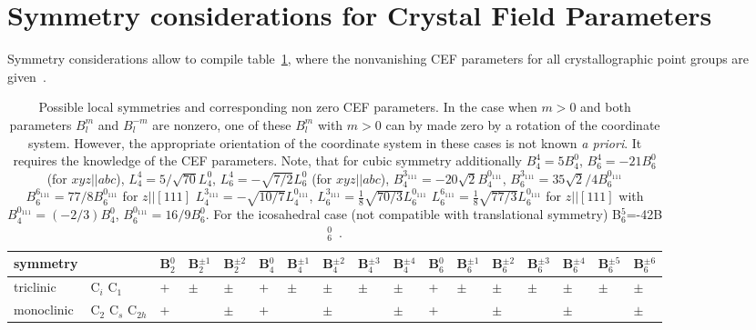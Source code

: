 \section{Symmetry considerations for Crystal Field Parameters}

Symmetry considerations allow to compile 
table~\ref{tab:symmetry}, where the nonvanishing
CEF parameters for all 
crystallographic point groups are
given~\cite{bauer09-183}.

\begin{landscape}

\begin{table}
\caption{Possible local symmetries and corresponding non zero CEF parameters.
  In the case when $m>0$ and both parameters $B_l^m$ and $B_l^{-m}$ are
nonzero, one of these $B_l^m$ with $m>0$
 can by made zero by a rotation of the coordinate system.
However, the appropriate orientation of 
the coordinate system in these cases is not known {\em a priori}. It requires
the knowledge of the CEF parameters.
Note, that for cubic symmetry additionally 
$B_4^4=5 B_4^0$, $B_6^4=-21 B_6^0$ (for $xyz||abc$), 
$L_4^4=5/\sqrt{70} L_4^0$, $L_6^4=-\sqrt{7/2} L_6^0$ (for $xyz||abc$), 
$B_4^{3_{111}}=-20\sqrt{2} B_4^{0_{111}}$, $B_6^{3_{111}}=35\sqrt{2}/4 B_6^{0_{111}}$ $B_6^{6_{111}}=77/8 B_6^{0_{111}}$ for $z||[111]$ 
$L_4^{3_{111}}=-\sqrt{10/7} L_4^{0_{111}}$, $L_6^{3_{111}}=\frac{1}{8}\sqrt{70/3} L_6^{0_{111}}$ 
$L_6^{6_{111}}=\frac{1}{8}\sqrt{77/3} L_6^{0_{111}}$ for $z||[111]$ 
       with $B_4^{0_{111}}=(-2/3)B_4^0$, $B_6^{0_{111}}=16/9B_6^0$. 
For the icosahedral case (not compatible with
translational symmetry) B$_6^5$=-42B$_6^0$~\cite{walter87-2504}.}
\label{tab:symmetry}
\begin{tabular}{lllllllllllllllll}
\hline
symmetry   &                                    &B$_2^0$&B$_2^{\pm 1}$&B$_2^{\pm 2}$&B$_4^0$&B$_4^{\pm 1}$&B$_4^{\pm 2}$&B$_4^{\pm 3}$&B$_4^{\pm 4}$&B$_6^0$&B$_6^{\pm 1}$&B$_6^{\pm 2}$&B$_6^{\pm 3}$&B$_6^{\pm 4}$&B$_6^{\pm 5}$&B$_6^{\pm 6}$\\
\hline
triclinic  & C$_i$ C$_1$                        &+      &$\pm$  &$\pm$&+     &$\pm$  &$\pm$  &$\pm$  &$\pm$  &+      &$\pm$  &$\pm$ &$\pm$&$\pm$  &$\pm$  &$\pm$  \\
monoclinic & C$_2$ C$_s$ C$_{2h}$               &+      &       &$\pm$ &+      &       &$\pm$  &       &$\pm$  &+      &       &$\pm$  & &$\pm$  &       &$\pm$  \\

\end{tabular}
\end{table}
\end{landscape}
